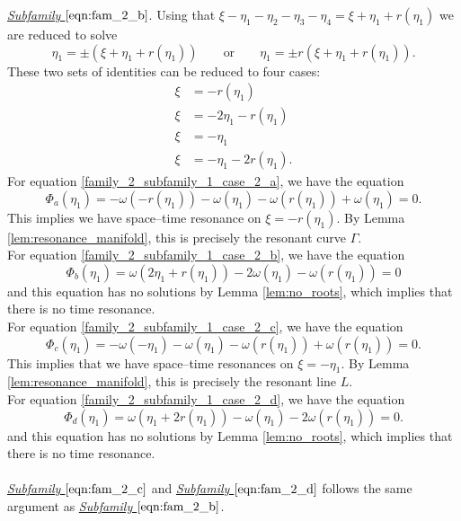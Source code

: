 \documentclass[reqno,english,11pt]{amsart}
\theoremstyle{definition}
\numberwithin{equation}{section}
\begin{document}
\noindent
{\it \underline{Subfamily $\eqref{eqn:fam_2_b}$}}.
Using that $\xi-\eta_1-\eta_2-\eta_3-\eta_4=\xi+\eta_1+r(\eta_1)$ we are reduced to solve
$$\eta_1=\pm \left(\xi+\eta_1+r(\eta_1)\right)\qquad \text{or}\qquad \eta_1=\pm r(\xi+\eta_1+r(\eta_1)).$$
These two sets of identities can be reduced to four cases:
\begin{subequations}
    \begin{align}
         \xi&=-r(\eta_1) \tag{a} \label{family_2_subfamily_1_case_2_a}
  \\
  \xi&=-2\eta_1-r(\eta_1) \tag{b} \label{family_2_subfamily_1_case_2_b}
 \\
  \xi&=-\eta_1 \tag{c} \label{family_2_subfamily_1_case_2_c}
 \\
   \xi&= -\eta_1-2r(\eta_1). \tag{d} \label{family_2_subfamily_1_case_2_d}
    \end{align} 
\end{subequations}
For equation \eqref{family_2_subfamily_1_case_2_a}, we have the equation
$$\Phi_a(\eta_1)=-\omega(-r(\eta_1))-\omega(\eta_1)-\omega(r(\eta_1))+\omega(\eta_1)=0.$$
This implies we have space--time resonance on $\xi=-r(\eta_1)$. By Lemma \ref{lem:resonance_manifold}, this is precisely the resonant curve $\Gamma$.
\\
\noindent
For equation \eqref{family_2_subfamily_1_case_2_b}, we have the equation
$$\Phi_b(\eta_1)=\omega(2\eta_1+r(\eta_1))-2\omega(\eta_1)-\omega(r(\eta_1))=0$$
and this equation has no solutions  by Lemma \ref{lem:no_roots}, which implies that there is no time resonance.
\\
\noindent
For equation \eqref{family_2_subfamily_1_case_2_c}, we have the equation 
$$\Phi_c(\eta_1)=-\omega(-\eta_1)-\omega(\eta_1)-\omega(r(\eta_1))+\omega(r(\eta_1))=0.$$
This implies that we have space--time resonances on $\xi=-\eta_1$. By Lemma \ref{lem:resonance_manifold}, this is precisely the resonant line $L$.
\\
\noindent
For equation \eqref{family_2_subfamily_1_case_2_d}, we have the equation 
$$\Phi_d(\eta_1)=\omega(\eta_1+2r(\eta_1))-\omega(\eta_1)-2\omega(r(\eta_1))=0.$$
and this equation has no solutions  by Lemma \ref{lem:no_roots}, which implies that there is no time resonance.\\\\
\noindent
{\it \underline{Subfamily $\eqref{eqn:fam_2_c}$}} and {\it \underline{Subfamily $\eqref{eqn:fam_2_d}$}} follows the same argument as {\it \underline{Subfamily $\eqref{eqn:fam_2_b}$}}.
\\\\
\end{document}
